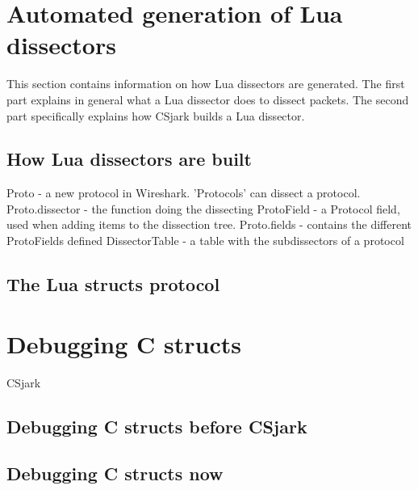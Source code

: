 \section{Automated generation of Lua dissectors}
This section contains information on how Lua dissectors are generated.
The first part explains in general what a Lua dissector does to dissect packets.
The second part specifically explains how CSjark builds a Lua dissector.

\subsection{How Lua dissectors are built}

Proto - a new protocol in Wireshark. 'Protocols' can dissect a protocol.
Proto.dissector - the function doing the dissecting
ProtoField - a Protocol field, used when adding items to the dissection tree.
Proto.fields - contains the different ProtoFields defined
DissectorTable - a table with the subdissectors of a protocol

\subsection{The Lua structs protocol}

\section{Debugging C structs}

CSjark 

\subsection{Debugging C structs before CSjark}

\subsection{Debugging C structs now}

